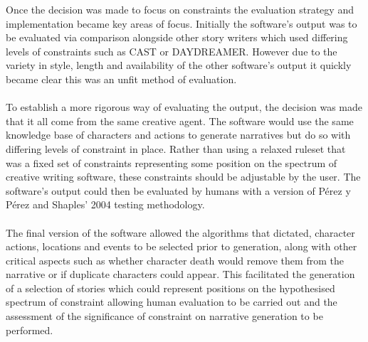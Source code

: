 \documentclass[letterpaper]{article}
\begin{document}
Once the decision was made to focus on constraints the evaluation strategy and implementation became key areas of focus. Initially the software's output was to be evaluated via comparison alongside other story writers which used differing levels of constraints such as CAST or DAYDREAMER. However due to the variety in style, length and availability of the other software's output it quickly became clear this was an unfit method of evaluation.\\
\\To establish a more rigorous way of evaluating the output, the decision was made that it all come from the same creative agent. The software would use the same knowledge base of characters and actions to generate narratives but do so with differing levels of constraint in place. Rather than using a relaxed ruleset that was a fixed set of constraints representing some position on the spectrum of creative writing software, these constraints should be adjustable by the user. The software's output could then be evaluated by humans with a version of P\'erez y P\'erez and Shaples' 2004 testing methodology.\\
\\The final version of the software allowed the algorithms that dictated, character actions, locations and events to be selected prior to generation, along with other critical aspects such as whether character death would remove them from the narrative or if duplicate characters could appear. This facilitated the generation of a selection of stories which could represent positions on the hypothesised spectrum of constraint allowing human evaluation to be carried out and the assessment of the significance of constraint on narrative generation to be performed.

\end{document}
